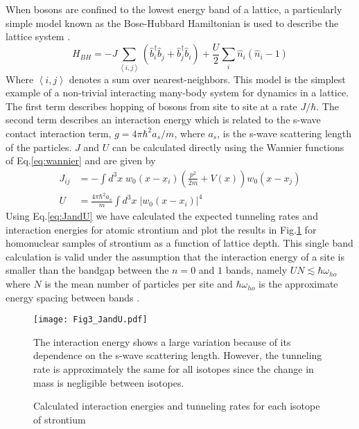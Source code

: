 When bosons are confined to the lowest energy band of a lattice, a particularly simple model known as the Bose-Hubbard Hamiltonian is used to describe the lattice system \cite{Jaksch1998}. 
	\begin{equation} \label{eq:boseHubbard}
		 H_{BH} = -J \sum_{\left< i,j \right>} \left(\hat{b}^{\dagger}_i \hat{b}_j + \hat{b}^{\dagger}_j \hat{b}_i \right)
		 		  + \frac{U}{2} \sum_i \hat{n}_i(\hat{n}_i - 1)
	\end{equation}
Where $\left< i,j \right>$ denotes a sum over nearest-neighbors. This model is the simplest example of a non-trivial interacting many-body system for dynamics in a lattice. The first term describes hopping of bosons from site to site at a rate $J/ \hbar$. The second term describes an interaction energy which is related to the s-wave contact interaction term, $g = 4 \pi \hbar^2 a_s/m$, where $a_s$, is the s-wave scattering length of the particles. $J$ and $U$ can be calculated directly using the Wannier functions of Eq.\;\ref{eq:wannier} and are given by \cite{Jaksch2005}
	\begin{equation} \label{eq:JandU}
	\begin{aligned}
		 J_{ij} &= - \int d^3x \; w_0(x-x_i) \left( \frac{p^2}{2m}+V(x) \right) w_0(x-x_j)\\
		 U &= \frac{4 \pi \hbar^2 a_s}{m} \int d^3x \; \left| w_0(x-x_i)\right|^4
	\end{aligned}
	\end{equation}
Using Eq.\;\ref{eq:JandU} we have calculated the expected tunneling rates and interaction energies for atomic strontium and plot the results in Fig.\;\ref{fig:fig_JandU} for homonuclear samples of strontium as a function of lattice depth. This single band calculation is valid under the assumption that the interaction energy of a site is smaller than the bandgap between the $n= 0$ and $1$ bands, namely $U N \lesssim \hbar \omega_{ho}$ where $N$ is the mean number of particles per site and $\hbar \omega_{ho}$ is the approximate energy spacing between bands \cite{Rey2004}. 


\begin{figure} \label{fig:fig_JandU}
	\centerline{
	\texttt{[image: Fig3\_JandU.pdf]}}
	\caption{Calculated interaction energies and tunneling rates for each isotope of strontium}{The interaction energy shows a large variation because of its dependence on the s-wave scattering length. However, the tunneling rate is approximately the same for all isotopes since the change in mass is negligible between isotopes.}
\end{figure}
	

